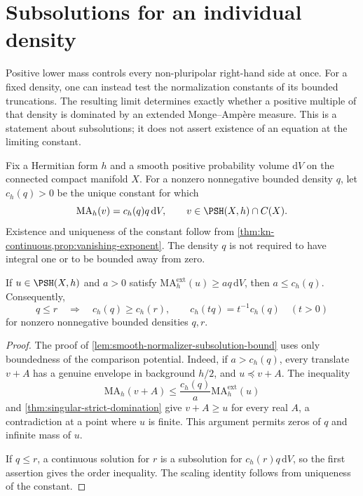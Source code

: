 \section{Subsolutions for an individual density}
\label{sec:individual-density-subsolutions}

Positive lower mass controls every non-pluripolar right-hand side at once. For a fixed density, one can instead test the normalization constants of its bounded truncations. The resulting limit determines exactly whether a positive multiple of that density is dominated by an extended Monge--Amp\`ere measure. This is a statement about subsolutions; it does not assert existence of an equation at the limiting constant.

Fix a Hermitian form $h$ and a smooth positive probability volume $\mathrm{d}V$ on the connected compact manifold $X$. For a nonzero nonnegative bounded density $q$, let $c_h(q)>0$ be the unique constant for which
\[
 \mathrm{MA}_h(v)=c_h(q)q\,\mathrm{d}V,
 \qquad v\in\PSH(X,h)\cap C(X).
\]
Existence and uniqueness of the constant follow from \cref{thm:kn-continuous,prop:vanishing-exponent}. The density $q$ is not required to have integral one or to be bounded away from zero.

\begin{lemma}\label{lem:bounded-normalizer-subsolution}
If $u\in\PSH(X,h)$ and $a>0$ satisfy
$\mathrm{MA}^{\mathrm{ext}}_h(u)\geq aq\,\mathrm{d}V$, then $a\leq c_h(q)$. Consequently,
\[
 q\leq r\quad\Longrightarrow\quad c_h(q)\geq c_h(r),
 \qquad c_h(tq)=t^{-1}c_h(q)\quad(t>0)
\]
for nonzero nonnegative bounded densities $q,r$.
\end{lemma}
\begin{proof}
The proof of \cref{lem:smooth-normalizer-subsolution-bound} uses only boundedness of the comparison potential. Indeed, if $a>c_h(q)$, every translate $v+A$ has a genuine envelope in background $h/2$, and $u\preceq v+A$. The inequality
\[
 \mathrm{MA}_h(v+A)\leq\frac{c_h(q)}a
                  \mathrm{MA}^{\mathrm{ext}}_h(u)
\]
and \cref{thm:singular-strict-domination} give $v+A\geq u$ for every real $A$, a contradiction at a point where $u$ is finite. This argument permits zeros of $q$ and infinite mass of $u$.

If $q\leq r$, a continuous solution for $r$ is a subsolution for $c_h(r)q\,\mathrm{d}V$, so the first assertion gives the order inequality. The scaling identity follows from uniqueness of the constant.
\end{proof}

